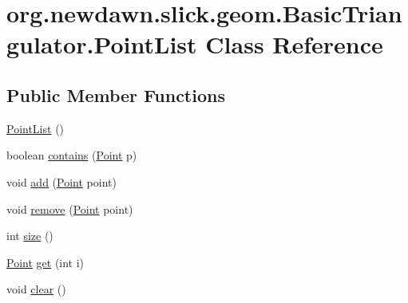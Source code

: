 \hypertarget{classorg_1_1newdawn_1_1slick_1_1geom_1_1_basic_triangulator_1_1_point_list}{}\section{org.\+newdawn.\+slick.\+geom.\+Basic\+Triangulator.\+Point\+List Class Reference}
\label{classorg_1_1newdawn_1_1slick_1_1geom_1_1_basic_triangulator_1_1_point_list}
\subsection*{Public Member Functions}
\begin{DoxyCompactItemize}
\item 
\mbox{\hyperlink{classorg_1_1newdawn_1_1slick_1_1geom_1_1_basic_triangulator_1_1_point_list_a2647a2f8f8fab306fcbfadd4b9e31cf7}{Point\+List}} ()
\item 
boolean \mbox{\hyperlink{classorg_1_1newdawn_1_1slick_1_1geom_1_1_basic_triangulator_1_1_point_list_a13c2cbedb044688c7b46d2d4932fce51}{contains}} (\mbox{\hyperlink{classorg_1_1newdawn_1_1slick_1_1geom_1_1_basic_triangulator_1_1_point}{Point}} p)
\item 
void \mbox{\hyperlink{classorg_1_1newdawn_1_1slick_1_1geom_1_1_basic_triangulator_1_1_point_list_aa9a80da4d541df0ea80e5c77aada368e}{add}} (\mbox{\hyperlink{classorg_1_1newdawn_1_1slick_1_1geom_1_1_basic_triangulator_1_1_point}{Point}} point)
\item 
void \mbox{\hyperlink{classorg_1_1newdawn_1_1slick_1_1geom_1_1_basic_triangulator_1_1_point_list_a42078869a9395d326f70fbccdbea8012}{remove}} (\mbox{\hyperlink{classorg_1_1newdawn_1_1slick_1_1geom_1_1_basic_triangulator_1_1_point}{Point}} point)
\item 
int \mbox{\hyperlink{classorg_1_1newdawn_1_1slick_1_1geom_1_1_basic_triangulator_1_1_point_list_acc38c8b7107150c8fd3231250711cc6b}{size}} ()
\item 
\mbox{\hyperlink{classorg_1_1newdawn_1_1slick_1_1geom_1_1_basic_triangulator_1_1_point}{Point}} \mbox{\hyperlink{classorg_1_1newdawn_1_1slick_1_1geom_1_1_basic_triangulator_1_1_point_list_ae1c25c4d9e9a4064036b06328cb14b2d}{get}} (int i)
\item 
void \mbox{\hyperlink{classorg_1_1newdawn_1_1slick_1_1geom_1_1_basic_triangulator_1_1_point_list_a06acb9cac9b3c8b9e3d238ad960b52f1}{clear}} ()
\end{DoxyCompactItemize}
